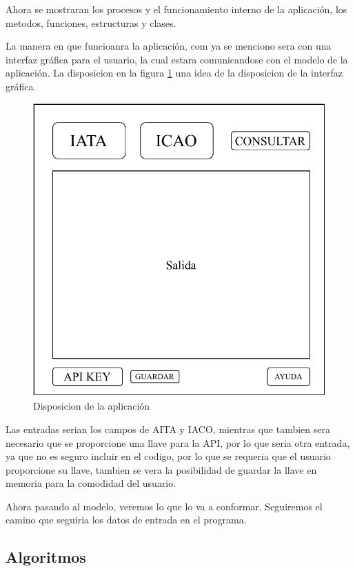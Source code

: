 Ahora se mostraran los procesos y el funcionamiento interno de la aplicación, los metodos, funciones, estructuras y clases.

La manera en que funcioanra la aplicación, com ya se menciono sera con una interfaz gráfica para el usuario, la cual estara comunicandose
con el modelo de la aplicación. La disposicion en la figura \ref{fig:UIDiagrama} una idea de la disposicion de la interfaz gráfica.
\begin{figure}[ht]
    \label{fig:UIDiagrama}
    \caption{Disposicion de la aplicación}
    \centering
    \includegraphics[width=\textwidth]{Figuras/UIDiagram.pdf}
\end{figure}

Las entradas serian los campos de AITA y IACO, mientras que tambien sera necesario que se proporcione una llave para la API, por lo
que seria otra entrada, ya que no es seguro incluir en el codigo, por lo que se requeria que el usuario proporcione su llave, tambien
se vera la posibilidad de guardar la llave en memoria para la comodidad del usuario.

Ahora pasando al modelo, veremos lo que lo va a conformar. Seguiremos el camino que seguiria los datos de entrada en el programa.

\subsection{Algoritmos}

